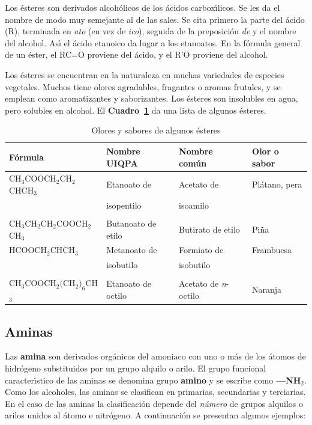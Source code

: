  Los \'esteres son derivados alcoh\'olicos de los \'acidos  carbox\'{\i}licos. Se les da el nombre de modo muy semejante al de las sales. Se cita primero la parte del \'acido (R), terminada en \textit{ato}  (en vez de \textit{ico}), seguida de la preposici\'on \textit{de} y el nombre del alcohol. As\'{\i} el \'acido etanoico da lugar a los etanoatos. En la f\'ormula general de un \'ester, el RC=O proviene del \'acido, y el R'O proviene del alcohol.

Los \'esteres se encuentran en la naturaleza en muchas variedades de especies vegetales. Muchos tiene olores agradables, fragantes o aromas frutales, y se emplean como aromatizantes y saborizantes. Los \'esteres son insolubles en agua, pero solubles en alcohol. El \textbf{Cuadro~\ref{ester}} da una lista de algunos \'esteres.
\begin{table}[hbt]
\caption{Olores y sabores de algunos \'esteres}
\label{ester}
{\small \begin{tabular}{llll}\hline
\textbf{F\'ormula} &\textbf{Nombre UIQPA}&\textbf{Nombre
com\'un}&\textbf{Olor o sabor}\\ \hline
{\scriptsize CH$_3$COOCH$_2$CH$_2$CHCH$_3$}
& Etanoato de&Acetato de &Pl\'atano, pera\\[-.05in]
\hspace{0.88in}{\scriptsize $|$}& isopentilo&isoamilo\\[-.02 in]
\hspace{.85in}{\scriptsize CH$_3$}\\
{\scriptsize CH$_3$CH$_2$CH$_2$COOCH$_2$CH$_3$} & Butanoato de etilo&
Butirato de etilo & Pi\~na\\
{\scriptsize HCOOCH$_2$CHCH$_3$ }&Metanoato de & Formiato de&
Frambuesa\\[-0.05in]
\hspace{0.5in}{\scriptsize $|$}& isobutilo& isobutilo\\[-.02in]
\hspace{0.46in}{\scriptsize CH$_3$}\\
{\scriptsize CH$_3$COOCH$_2($CH$_2)_6$CH$_3$}& Etanoato de octilo &
Acetato de
\textit{n}-octilo& Naranja\\ \hline
\end{tabular}}
\end{table}

 \subsection{Aminas}
Las \textbf{\gls{amina}} son derivados org\'anicos del amoniaco  con uno  o m\'as de los \'atomos de hidr\'ogeno substituidos 
por un grupo alquilo o arilo. El grupo funcional caracter\'{\i}stico de las  aminas se denomina grupo \textbf{amino}  y se escribe
como \textbf{---NH$_2$}. Como los alcoholes, las aminas se clasifican en primarias, secundarias y terciarias. En el caso de las aminas la
clasificaci\'on depende del \textit{n\'umero} de grupos alquilos o arilos unidos al \'atomo e nitr\'ogeno. A continuaci\'on se presentan algunos
ejemplos:

